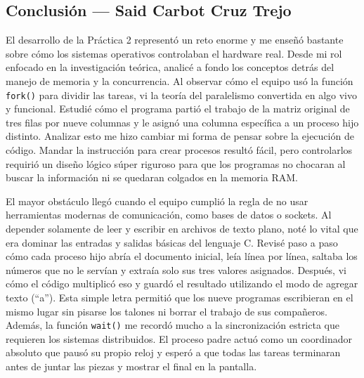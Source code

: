 \clearpage
\subsection{Conclusión — Said Carbot Cruz Trejo}
\label{sec:prac02:concl:said}

El desarrollo de la Práctica 2 representó un reto enorme y me enseñó bastante sobre cómo los sistemas operativos controlaban el hardware real. Desde mi rol enfocado en la investigación teórica, analicé a fondo los conceptos detrás del manejo de memoria y la concurrencia. Al observar cómo el equipo usó la función \texttt{fork()} para dividir las tareas, vi la teoría del paralelismo convertida en algo vivo y funcional. Estudié cómo el programa partió el trabajo de la matriz original de tres filas por nueve columnas y le asignó una columna específica a un proceso hijo distinto. Analizar esto me hizo cambiar mi forma de pensar sobre la ejecución de código. Mandar la instrucción para crear procesos resultó fácil, pero controlarlos requirió un diseño lógico súper riguroso para que los programas no chocaran al buscar la información ni se quedaran colgados en la memoria RAM.

El mayor obstáculo llegó cuando el equipo cumplió la regla de no usar herramientas modernas de comunicación, como bases de datos o sockets. Al depender solamente de leer y escribir en archivos de texto plano, noté lo vital que era dominar las entradas y salidas básicas del lenguaje C. Revisé paso a paso cómo cada proceso hijo abría el documento inicial, leía línea por línea, saltaba los números que no le servían y extraía solo sus tres valores asignados. Después, vi cómo el código multiplicó eso y guardó el resultado utilizando el modo de agregar texto (``a''). Esta simple letra permitió que los nueve programas escribieran en el mismo lugar sin pisarse los talones ni borrar el trabajo de sus compañeros. Además, la función \texttt{wait()} me recordó mucho a la sincronización estricta que requieren los sistemas distribuidos. El proceso padre actuó como un coordinador absoluto que pausó su propio reloj y esperó a que todas las tareas terminaran antes de juntar las piezas y mostrar el final en la pantalla.

